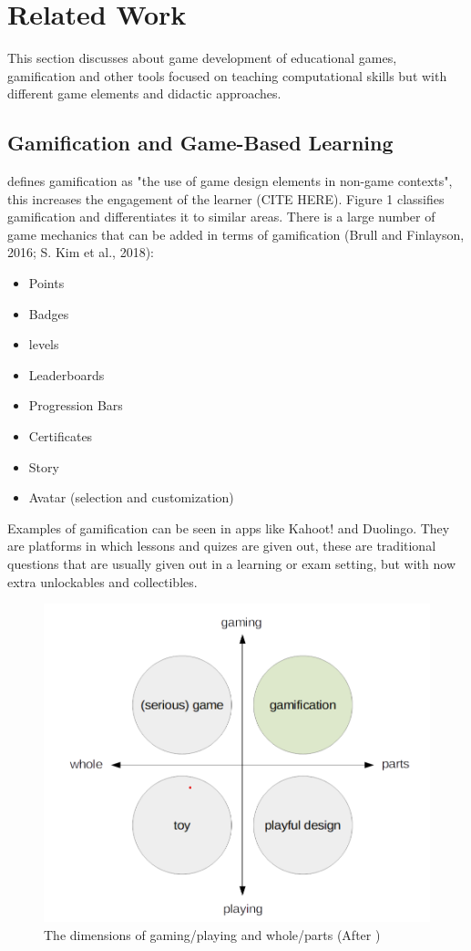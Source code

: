 \section{Related Work}
This section discusses about game development of educational games, gamification and other tools focused on teaching computational skills but with different game elements and didactic approaches.

\subsection{Gamification and Game-Based Learning}
\cite{10.1145/2181037.2181040} defines gamification as "the use of game design elements in non-game contexts", this increases the engagement of the learner   (CITE HERE). Figure 1 classifies gamification and differentiates it to similar areas. There is a large number of game mechanics that can be added in terms of gamification (Brull and Finlayson, 2016; S. Kim et al., 2018):
\begin{itemize}
    \item Points
    \item Badges
    \item levels
    \item Leaderboards
    \item Progression Bars
    \item Certificates
    \item Story
    \item Avatar (selection and customization)
\end{itemize}

Examples of gamification can be seen in apps like Kahoot! and Duolingo. They are platforms in which lessons and quizes are given out, these are traditional questions that are usually given out in a learning or exam setting, but with now extra unlockables and collectibles. 

\begin{figure}[H]
    \centering
    \includegraphics[width=0.5\linewidth]{images/dimensions.png}
    \caption{The dimensions of gaming/playing and whole/parts (After \cite{10.1145/2181037.2181040})}
\end{figure}

